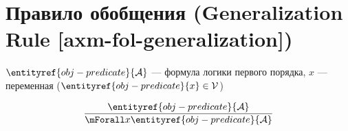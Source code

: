 
\section{Правило обобщения (Generalization Rule [axm-fol-generalization])}

\hypertarget{axm-fol-generalization}{}
\hypertarget{axm-fol-generalization}{}
\begin{axiom}
\label{entity:axm-fol-generalization}
$\entityref{obj-predicate}{\mathcal{A}}$ --- формула логики первого порядка,
$x$ --- переменная ($\entityref{obj-predicate}{x} \in \mathcal{V}$)

\[
\frac{\entityref{obj-predicate}{\mathcal{A}}}{\mForall x \entityref{obj-predicate}{\mathcal{A}}}
\]
\end{axiom}